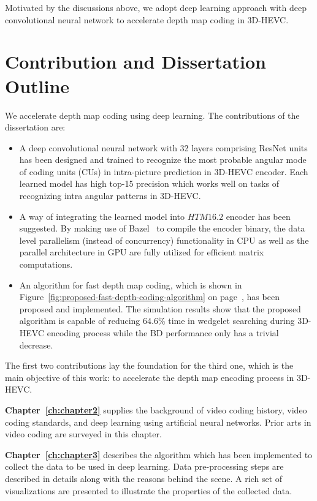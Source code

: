 Motivated by the discussions above, we adopt deep learning approach with
deep convolutional neural network to accelerate depth map coding in
3D-HEVC\@.

\section{Contribution and Dissertation Outline}\label{sec:outline}
We accelerate depth map coding using deep learning.
The contributions of the dissertation are:
\begin{itemize}
  \item A deep convolutional neural network with 32 layers 
  comprising ResNet units~\parencite{RN67}
  has been designed and trained to recognize the
  most probable angular mode of coding units (CUs) 
  in intra-picture prediction in 3D-HEVC
  encoder.
  Each learned model has high top-15 precision which works 
  well on tasks of recognizing intra angular patterns in 3D-HEVC\@.
  \item A way of integrating the learned model into \(HTM16.2\) encoder has
  been suggested.
  By making use of Bazel~\parencite{RN200} to compile the encoder binary, the
  data level parallelism (instead of concurrency) functionality in CPU
  as well as the parallel architecture in GPU are fully utilized for
  efficient matrix computations.
  \item An algorithm for fast
  depth map coding, which is shown
  in Figure~\ref{fig:proposed-fast-depth-coding-algorithm}
  on page~\pageref{fig:proposed-fast-depth-coding-algorithm},
  has been proposed and implemented.
  The simulation results show that the proposed algorithm is capable of
  reducing 64.6\% time in wedgelet searching during 3D-HEVC encoding process
  while the BD performance only has a trivial decrease.
\end{itemize}
The first two contributions lay the foundation for the third one, which is the
main objective of this work: to accelerate the depth map encoding process in
3D-HEVC\@.

\textbf{Chapter~\ref{ch:chapter2}} supplies the background of video
coding history, video coding standards, and deep learning using artificial
neural networks.
Prior arts in video coding are surveyed in this chapter.

\textbf{Chapter~\ref{ch:chapter3}} describes the algorithm which has been
implemented to collect the data to be used in deep learning.
Data pre-processing steps are described in details along with
the reasons behind the scene. 
A rich set of visualizations are presented to illustrate 
the properties of the collected data.

